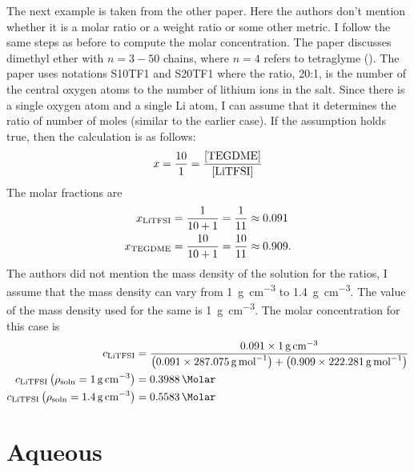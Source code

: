 \documentclass[12pt]{book}
\begin{document}
The next example is taken from the other paper. Here the authors don't mention whether it is a molar ratio or a weight ratio or some other metric. I follow the same steps as before to compute the molar concentration. The paper discusses dimethyl ether with $n=3-50$ chains, where $n=4$ refers to tetraglyme ().
The paper uses notations S10TF1 and S20TF1 where the ratio, 20:1, is the number of the central oxygen atoms to the number of lithium ions in the salt. Since there is a single oxygen atom and a single Li atom, I can assume that it determines the ratio of number of moles (similar to the earlier case). If the assumption holds true, then the calculation is as follows:
\begin{equation}
x=\frac{10}{1}=\frac{[\ce{TEGDME}]}{[\ce{LiTFSI}]}
\end{equation}
The molar fractions are
\begin{align}
x_{\ce{LiTFSI}}&=\frac{1}{10+1}=\frac{1}{11}\approx 0.091\\
x_{\ce{TEGDME}}&=\frac{10}{10+1}=\frac{10}{11}\approx 0.909.
\end{align}
The authors did not mention the mass density of the solution for the ratios, I assume that the mass density can vary from \SI{1}{\gram\per\centi\meter\cubed} to \SI{1.4}{\gram\per\centi\meter\cubed}. The value of the mass density used for the same is \SI{1}{\gram\per\centi\meter\cubed}. The molar concentration for this case is 
\begin{align}
c_{\ce{LiTFSI}}&=\frac{\num{0.091}\times\SI{1}{\gram\per\centi\meter\cubed}}{\left(\num{0.091}\times\SI{287.075}{\gram\per\mole}\right)+\left(\num{0.909}\times\SI{222.281}{\gram\per\mole}\right)}\nonumber\\
c_{\ce{LiTFSI}}\left(\rho_{\textrm{soln}}=\SI{1}{\gram\per\centi\meter\cubed}\right)&=\SI{0.3988}{\Molar}\nonumber\\
c_{\ce{LiTFSI}}\left(\rho_{\textrm{soln}}=\SI{1.4}{\gram\per\centi\meter\cubed}\right)&=\SI{0.5583}{\Molar}
\end{align}


\section{Aqueous}
\end{document}

